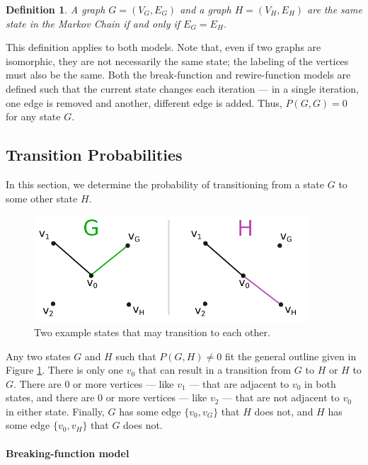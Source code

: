 \documentclass[a4paper,10pt]{article}
\newtheorem{defn}{Definition}
\begin{document}
\begin{defn}
 A graph $G = (V_G, E_G)$ and a graph $H = (V_H, E_H)$ are the same state in the Markov Chain if and only if $E_G = E_H$.
\end{defn}

This definition applies to both models. Note that, even if two graphs are isomorphic, they are not necessarily the same state; the labeling of the vertices must also be the same. Both the break-function and rewire-function models are defined such that the current state changes each iteration --- in a single iteration, one edge is removed and another, different edge is added. Thus, $P(G, G) = 0$ for any state $G$.

\subsection{Transition Probabilities}

In this section, we determine the probability of transitioning from a state $G$ to some other state $H$.

 \begin{center}
\begin{figure}[H]
  \includegraphics[height=4.0cm]{images/transition_prob.png}
  \caption{Two example states that may transition to each other.}
 \label{fig:example-states}

\end{figure}
 \end{center}

Any two states $G$ and $H$ such that $P(G, H) \neq 0$ fit the general outline given in Figure \ref{fig:example-states}. There is only one $v_0$ that can result in a transition from $G$ to $H$ or $H$ to $G$. There are 0 or more vertices --- like $v_1$ --- that are adjacent to $v_0$ in both states, and there are 0 or more vertices --- like $v_2$ --- that are not adjacent to $v_0$ in either state. Finally, $G$ has some edge $\{v_0, v_G\}$ that $H$ does not, and $H$ has some edge $\{v_0, v_H\}$ that $G$ does not.

\paragraph{Breaking-function model}
\end{document}
